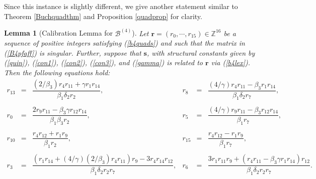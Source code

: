 \documentclass[letterpaper,10pt]{amsart}
\newcommand{\bZ}{{\mathbb{Z}}}
\newcommand{\Br}{{\mathbf{r}}}
\newcommand{\Bs}{{\mathbf{s}}}
\newcommand{\B}{{\mathcal{B}}}
\newtheorem{lemma}[theorem]{Lemma}
\theoremstyle{definition}
\numberwithin{equation}{section}
\begin{document}
Since this instance is slightly different, we give another statement similar to Theorem \ref{Buchquadthm} and Proposition \ref{quadprop} for clarity. 

\begin{lemma}[Calibration Lemma for $\B^{(4)}$] \label{b4cal} Let $\Br = (r_0, \cdots, r_{15}) \in \bZ^{16}$ be a sequence of positive integers satisfying (\ref{b4quads}) and such that the matrix in (\ref{B4pfaff}) is singular. Further, suppose that $\Bs$, with structural constants given by (\ref{quin}), (\ref{con1}), (\ref{con2}), (\ref{con3}), and (\ref{gamma}) is related to $\Br$ via (\ref{b4lex}). Then the following equations hold:  
\begin{equation} \label{b4eqs} 
\begin{matrix} r_{13} & = & \dfrac{(2/\beta_3) r_4 r_{11} + \gamma r_1 r_{14}}{\beta_1 \delta_2 r_2}, & r_8 & = & \dfrac{(4/\gamma) r_4 r_{11} - \beta_3 r_1 r_{14}}{\beta_1 \delta_2 r_7}, \\ \\
r_0 & = & \dfrac{2 r_9 r_{11} - \beta_3 \gamma r_{12} r_{14}}{\beta_1 \beta_3 r_2}, & r_5 & = & \dfrac{(4/\gamma) r_9 r_{11} - \beta_3 r_{12} r_{14}}{\beta_1 r_7}, \\ \\
r_{10} & = & \dfrac{r_{4} r_{12} + r_1 r_9}{\beta_1 r_2}, & r_{15} & = & \dfrac{r_4 r_{12} - r_1 r_9}{\beta_1 r_7}, \\ \\
r_3 & = & \dfrac{(r_1 r_{14} + (4/\gamma)(2/\beta_3) r_4 r_{11})r_9 - 3 r_4 r_{14} r_{12}}{\beta_1 \delta_2 r_2 r_7}, & r_6 & = & \dfrac{3 r_1 r_{11} r_9 + (r_4 r_{11} - \beta_3 \gamma r_1 r_{14})r_{12}}{\beta_1 \delta_2 r_2 r_7}.
\end{matrix}
\end{equation}
\end{lemma} 
\end{document}
